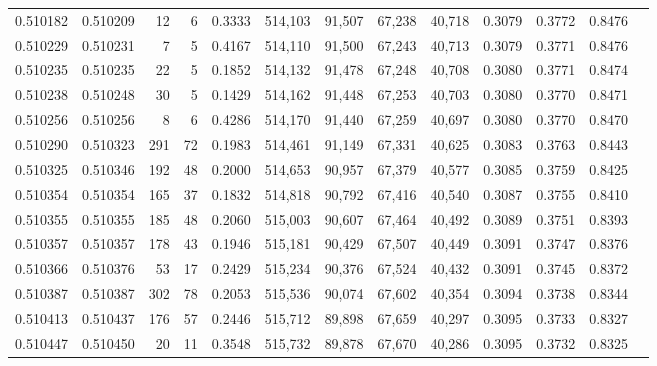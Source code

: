 \begin{tabular}{rrrrrrrrrrrrr}
0.510182 & 0.510209 &    12 &     6 &                                     0.3333 & 514,103 &  91,507 &  67,238 &  40,718 & 0.3079 & 0.3772 & 0.8476 \\
0.510229 & 0.510231 &     7 &     5 &                                     0.4167 & 514,110 &  91,500 &  67,243 &  40,713 & 0.3079 & 0.3771 & 0.8476 \\
0.510235 & 0.510235 &    22 &     5 &                                     0.1852 & 514,132 &  91,478 &  67,248 &  40,708 & 0.3080 & 0.3771 & 0.8474 \\
0.510238 & 0.510248 &    30 &     5 &                                     0.1429 & 514,162 &  91,448 &  67,253 &  40,703 & 0.3080 & 0.3770 & 0.8471 \\
0.510256 & 0.510256 &     8 &     6 &                                     0.4286 & 514,170 &  91,440 &  67,259 &  40,697 & 0.3080 & 0.3770 & 0.8470 \\
0.510290 & 0.510323 &   291 &    72 &                                     0.1983 & 514,461 &  91,149 &  67,331 &  40,625 & 0.3083 & 0.3763 & 0.8443 \\
0.510325 & 0.510346 &   192 &    48 &                                     0.2000 & 514,653 &  90,957 &  67,379 &  40,577 & 0.3085 & 0.3759 & 0.8425 \\
0.510354 & 0.510354 &   165 &    37 &                                     0.1832 & 514,818 &  90,792 &  67,416 &  40,540 & 0.3087 & 0.3755 & 0.8410 \\
0.510355 & 0.510355 &   185 &    48 &                                     0.2060 & 515,003 &  90,607 &  67,464 &  40,492 & 0.3089 & 0.3751 & 0.8393 \\
0.510357 & 0.510357 &   178 &    43 &                                     0.1946 & 515,181 &  90,429 &  67,507 &  40,449 & 0.3091 & 0.3747 & 0.8376 \\
0.510366 & 0.510376 &    53 &    17 &                                     0.2429 & 515,234 &  90,376 &  67,524 &  40,432 & 0.3091 & 0.3745 & 0.8372 \\
0.510387 & 0.510387 &   302 &    78 &                                     0.2053 & 515,536 &  90,074 &  67,602 &  40,354 & 0.3094 & 0.3738 & 0.8344 \\
0.510413 & 0.510437 &   176 &    57 &                                     0.2446 & 515,712 &  89,898 &  67,659 &  40,297 & 0.3095 & 0.3733 & 0.8327 \\
0.510447 & 0.510450 &    20 &    11 &                                     0.3548 & 515,732 &  89,878 &  67,670 &  40,286 & 0.3095 & 0.3732 & 0.8325 \\

\end{tabular}
